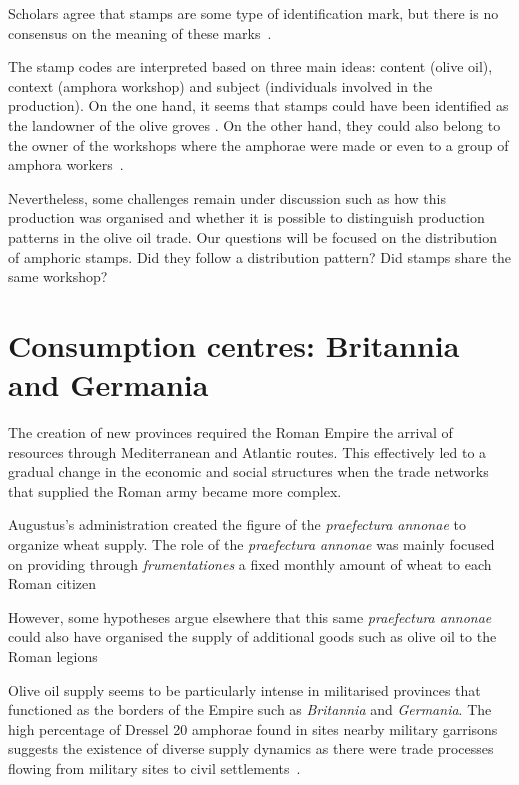 Scholars agree that stamps are some type of identification mark, but there is no consensus on the meaning of these marks~\citep{rodriguez_baetican_1998}. 


The stamp codes are interpreted based on three main ideas: content (olive oil), context (amphora workshop) and subject (individuals involved in the production). On the one hand, it seems that stamps could have been identified as the landowner of the olive groves \citep{rodriguez_economioleicola_1977}. On the other hand, they could also belong to the owner of the workshops where the amphorae were made or even to a group of amphora workers~\citep{berni_millet_epigrafianforica_2008}. 

Nevertheless, some challenges remain under discussion such as how this production was organised and whether it is possible to distinguish production patterns in the olive oil trade. Our questions will be focused on the distribution of amphoric stamps. Did they follow a distribution pattern? Did stamps share the same workshop? 


\section{Consumption centres: Britannia and Germania}
\label{sec:3}

The creation of new provinces required the Roman Empire the arrival of resources through Mediterranean and Atlantic routes. This effectively led to a gradual change in the economic and social structures when the trade networks that supplied the Roman army became more complex. 

Augustus's administration created the figure of the \textit{praefectura annonae} to organize wheat supply. The role of the \textit{praefectura annonae} was mainly focused on providing through \textit{frumentationes} a fixed monthly amount of wheat to each Roman citizen~\citep{remesal_annona_1986,remesal_concierto}

However, some hypotheses argue elsewhere that this same \textit{praefectura annonae} could also have organised the supply of additional goods such as olive oil to the Roman legions  \citep{remesal_annona_1986,
remesal_annona_1990}

Olive oil supply seems to be particularly intense in militarised provinces that functioned as the borders of the Empire such as \textit{Britannia} and \textit{Germania}. The high percentage of Dressel 20 amphorae found in sites nearby military garrisons suggests the existence of diverse supply dynamics as there were trade processes flowing from military sites to civil settlements~\citep{remesal_annona_1986, carreras_britannia_1998}.

